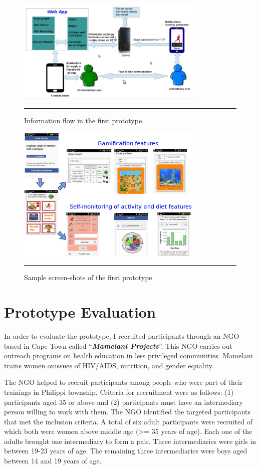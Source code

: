 \begin{figure}[htbp]
  \centering
    \includegraphics[width=0.8\textwidth]{Figures/prototype_1.png}
    \rule{35em}{0.5pt}
  \caption{Information flow in the first prototype.}
  \label{figure:prototype_1}
\end{figure}

\begin{figure}[htbp]
  \centering
    \includegraphics[width=0.8\textwidth]{Figures/Version1/Prototype1Screenshots.png}
    \rule{35em}{0.5pt}
  \caption{Sample screen-shots of the first prototype}
  \label{figure:prototype_1_screens}
\end{figure}
\section{Prototype Evaluation}
In order to evaluate the prototype, I recruited participants through an NGO
based in Cape Town called ``\textbf{\textit{Mamelani Projects}}''. This NGO
carries out outreach programs on health education in less privileged
communities. Mamelani trains women onissues of HIV/AIDS, nutrition, and gender equality. 

The NGO helped to recruit participants among people who were part of their trainings in Philippi township. Criteria for recruitment were as follows: (1) participants aged 35 or above and (2) participants must have an intermediary person willing to work with them. The NGO identified the targeted participants that met the inclusion criteria. A total of six adult participants were recruited of which both were women above middle age (\textgreater= 35 years of age). Each one of the adults brought one intermediary to form a pair. Three intermediaries were girls in between 19-23 years of age. The remaining three intermediaries were boys aged between 14 and 19 years of age. 

